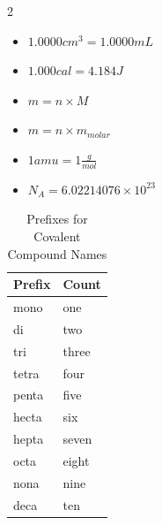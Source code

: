 \documentclass[11pt,addpoints]{exam}   	%
\begin{document}
\begin{multicols}{2}
\begin{itemize}
\item
$ 1.0000 cm^3 = 1.0000 mL $
\vspace{0.2in}

\item
$ 1.000 cal = 4.184 J $
\vspace{0.2in}

\item
$m = n \times M$
\vspace{0.2in}

\item
$m = n \times m_{molar}$
\vspace{0.2in}

\item
$1 amu = 1 \frac{g}{mol}$ 
\vspace{0.2in}

\item
$N_A = 6.02214076 \times 10^{23} $ 
\vspace{0.2in}

\end{itemize}
\vspace{0.2in}

\end{multicols}




\pagebreak

\begin{table}
\centering
\begin{tabular}[p]{| l | l |}
\textbf{Prefix} & \textbf{Count} \\
\hline
mono & one \\
di       & two \\
tri       & three \\
tetra       & four \\
penta       & five \\
hecta       & six \\
hepta       & seven \\
octa       & eight \\
nona       & nine \\
deca       & ten \\
\end{tabular}
\caption{Prefixes for Covalent Compound Names}
\label{table:covalent-prefix}
\end{table}
\end{document}
